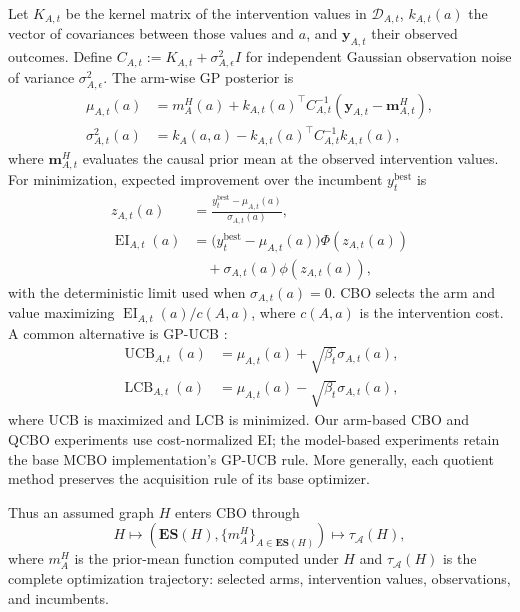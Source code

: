 \documentclass[twoside]{article}
\newcommand{\ES}{\mathbf{ES}}
\begin{document}
Let $K_{A,t}$ be the kernel matrix of the intervention values in
$\mathcal D_{A,t}$, $k_{A,t}(a)$ the vector of covariances between those
values and $a$, and $\mathbf y_{A,t}$ their observed outcomes. Define
$C_{A,t}:=K_{A,t}+\sigma_{A,\epsilon}^2I$ for independent Gaussian
observation noise of variance $\sigma_{A,\epsilon}^2$. The arm-wise GP
posterior is
\begin{align}
 \mu_{A,t}(a)
 &=m_A^H(a)+k_{A,t}(a)^\top
   C_{A,t}^{-1}(\mathbf y_{A,t}-\mathbf m_{A,t}^H),\nonumber\\
 \sigma_{A,t}^2(a)
 &=k_A(a,a)-k_{A,t}(a)^\top
   C_{A,t}^{-1}k_{A,t}(a),
 \label{eq:gp-posterior}
\end{align}
where $\mathbf m_{A,t}^H$ evaluates the causal prior mean at the observed
intervention values. For minimization, expected improvement over the
incumbent $y_t^{\mathrm{best}}$ is
\begin{align}
 z_{A,t}(a)&=\frac{y_t^{\mathrm{best}}-\mu_{A,t}(a)}
                   {\sigma_{A,t}(a)},\nonumber\\
 \operatorname{EI}_{A,t}(a)
 &=\bigl(y_t^{\mathrm{best}}-\mu_{A,t}(a)\bigr)
   \Phi(z_{A,t}(a))\nonumber\\
 &\quad+\sigma_{A,t}(a)\phi(z_{A,t}(a)),
 \label{eq:ei}
\end{align}
with the deterministic limit used when $\sigma_{A,t}(a)=0$. CBO selects the
arm and value maximizing $\operatorname{EI}_{A,t}(a)/c(A,a)$, where
$c(A,a)$ is the intervention cost. A common alternative is GP-UCB
\citep{srinivasGaussianProcessOptimization2010}:
\begin{align}
 \operatorname{UCB}_{A,t}(a)
 &=\mu_{A,t}(a)+\sqrt{\beta_t}\sigma_{A,t}(a),\nonumber\\
 \operatorname{LCB}_{A,t}(a)
 &=\mu_{A,t}(a)-\sqrt{\beta_t}\sigma_{A,t}(a),
 \label{eq:confidence-bounds}
\end{align}
where UCB is maximized and LCB is minimized. Our arm-based CBO and QCBO
experiments use cost-normalized EI; the model-based experiments retain the
base MCBO implementation's GP-UCB rule. More generally, each quotient method
preserves the acquisition rule of its base optimizer.

Thus an assumed graph $H$ enters CBO through
\begin{equation}
 H\longmapsto
 \left(\ES(H),\{m_A^H\}_{A\in\ES(H)}\right)
 \longmapsto \tau_{\mathcal A}(H),
 \label{eq:trajectory-map}
\end{equation}
where $m_A^H$ is the prior-mean function computed under $H$ and
$\tau_{\mathcal A}(H)$ is the complete optimization trajectory: selected
arms, intervention values, observations, and incumbents.
\end{document}
